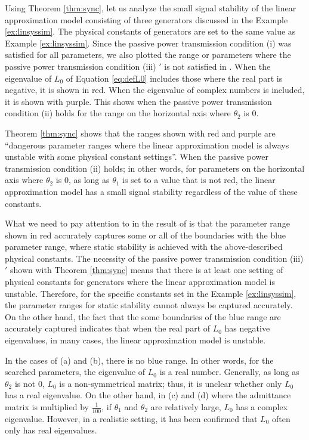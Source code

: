 \documentclass[tombow,dvipdfmx]{corona-a5-1.1}
\begin{document}
\begin{例}\label{ex:linthm}
Using Theorem \ref{thm:sync}, let us analyze the small signal stability of the linear approximation model consisting of three generators discussed in the Example \ref{ex:linsyssim}.
The physical constants of generators are set to the same value as Example \ref{ex:linsyssim}.
Since the passive power transmission condition (i) was satisfied for all parameters, we also plotted the range or parameters where the passive power transmission condition (iii) $'$ is not satisfied in .
When the eigenvalue of $L_0$ of Equation \ref{eq:defL0} includes those where the real part is negative, it is shown in red.
When the eigenvalue of complex numbers is included, it is shown with purple.
This shows when the passive power transmission condition (ii) holds for the range on the horizontal axis where $\theta_2$ is 0.

Theorem \ref{thm:sync} shows that the ranges shown with red and purple are “dangerous parameter ranges where the linear approximation model is always unstable with some physical constant settings”.
When the passive power transmission condition (ii) holds; in other words, for parameters on the horizontal axis where $\theta_2$ is 0, as long as $\theta_1$ is set to a value that is not red, the linear approximation model has a small signal stability regardless of the value of these constants.

What we need to pay attention to in the result of  is that the parameter range shown in red accurately captures some or all of the boundaries with the blue parameter range, where static stability is achieved with the above-described physical constants.
The necessity of the passive power transmission condition (iii)$'$ shown with Theorem \ref{thm:sync} means that there is at least one setting of physical constants for generators where the linear approximation model is unstable.
Therefore, for the specific constants set in the Example \ref{ex:linsyssim}, the parameter ranges for static stability cannot always be captured accurately.
On the other hand, the fact that the some boundaries of the blue range are accurately captured indicates that when the real part of $L_0$ has negative eigenvalues, in many cases, the linear approximation model is unstable.

In the cases of (a) and (b), there is no blue range.
In other words, for the searched parameters, the eigenvalue of $L_0$ is a real number.
Generally, as long as $\theta_2$ is not 0, $L_0$ is a non-symmetrical matrix; thus, it is unclear whether only $L_0$ has a real eigenvalue.
On the other hand, in (c) and (d) where the admittance matrix is multiplied by $\tfrac{1}{100}$, if $\theta_1$ and $\theta_2$ are relatively large, $L_0$ has a complex eigenvalue.
However, in a realistic setting, it has been confirmed that $L_0$ often only has real eigenvalues.
\end{例}
\end{document}
